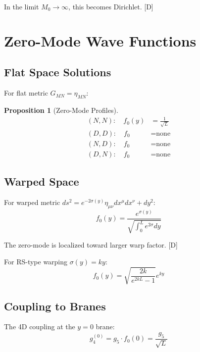 \documentclass[11pt,a4paper]{article}
\newtheorem{proposition}[theorem]{Proposition}
\newcommand{\tagD}{\textcolor{blue!70!black}{[D]}}
\begin{document}
In the limit $M_0 \to \infty$, this becomes Dirichlet. \tagD

\section{Zero-Mode Wave Functions}
\label{app:wavefn}

\subsection{Flat Space Solutions}

For flat metric $G_{MN} = \eta_{MN}$:

\begin{proposition}[Zero-Mode Profiles]
\label{prop:zero-profiles}
\begin{align}
\label{eq:profile-NN}
(N,N): \quad f_0(y) &= \frac{1}{\sqrt{L}} \\
\label{eq:profile-DD}
(D,D): \quad f_0 &= \text{none} \\
\label{eq:profile-ND}
(N,D): \quad f_0 &= \text{none} \\
\label{eq:profile-DN}
(D,N): \quad f_0 &= \text{none}
\end{align}
\end{proposition}

\subsection{Warped Space}

For warped metric $ds^2 = e^{-2\sigma(y)} \eta_{\mu\nu} dx^\mu dx^\nu + dy^2$:
\begin{equation}
\label{eq:warped-zero}
f_0(y) = \frac{e^{\sigma(y)}}{\sqrt{\int_0^L e^{2\sigma} dy}}
\end{equation}

The zero-mode is localized toward larger warp factor. \tagD

For RS-type warping $\sigma(y) = ky$:
\begin{equation}
\label{eq:rs-zero}
f_0(y) = \sqrt{\frac{2k}{e^{2kL}-1}} e^{ky}
\end{equation}

\subsection{Coupling to Branes}

The 4D coupling at the $y = 0$ brane:
\begin{equation}
\label{eq:brane-coupling}
g_4^{(0)} = g_5 \cdot f_0(0) = \frac{g_5}{\sqrt{L}}
\end{equation}
\end{document}
